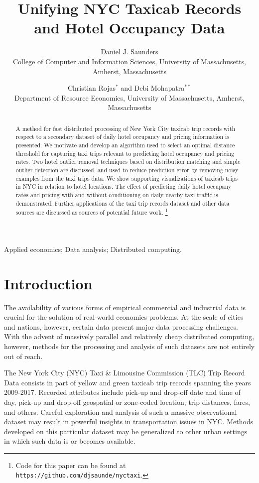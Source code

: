 \documentclass[useAMS, referee, usenatbib]{biom}
\title{Unifying NYC Taxicab Records and Hotel Occupancy Data}
\author
{Daniel J. Saunders \emailx{djsaunde@cs.umass.edu} \\
College of Computer and Information Sciences, University of Massachusetts, Amherst, Massachusetts
\and
Christian Rojas$^{*}$\email{rojas@resecon.umass.edu} and
Debi Mohapatra$^{**}$\email{dmohapatra@umass.edu} \\
Department of Resource Economics, University of Massachusetts, 
Amherst, Massachusetts}
\newcommand\blfootnote[1]{%
  \begingroup
  \renewcommand\thefootnote{}\footnote{#1}%
  \addtocounter{footnote}{-1}%
  \endgroup
}
\begin{document}
\label{firstpage}

\begin{abstract}
A method for fast distributed processing of New York City taxicab trip records with respect to a secondary dataset of daily hotel occupancy and pricing information is presented. We motivate and develop an algorithm used to select an optimal distance threshold for capturing taxi trips relevant to predicting hotel occupancy and pricing rates. Two hotel outlier removal techniques based on distribution matching and simple outlier detection are discussed, and used to reduce prediction error by removing noisy examples from the taxi trips data. We show supporting visualizations of taxicab trips in NYC in relation to hotel locations. The effect of predicting daily hotel occupany rates and pricing with and without conditioning on daily nearby taxi traffic is demonstrated. Further applications of the taxi trip records dataset and other data sources are discussed as sources of potential future work. \blfootnote{Code for this paper can be found at \texttt{https://github.com/djsaunde/nyctaxi}.}
\end{abstract}

\begin{keywords}
Applied economics; Data analysis; Distributed computing.
\end{keywords}

\maketitle

\section{Introduction}
\label{s:intro}

The availability of various forms of empirical commercial and industrial data is crucial for the solution of real-world economics problems. At the scale of cities and nations, however, certain data present major data processing challenges. With the advent of massively parallel and relatively cheap distributed computing, however, methods for the processing and analysis of such datasets are not entirely out of reach.

The New York City (NYC) Taxi \& Limousine Commission (TLC) Trip Record Data consists in part of yellow and green taxicab trip records spanning the years 2009-2017. Recorded attributes include pick-up and drop-off date and time of day, pick-up and drop-off geospatial or zone-coded location, trip distances, fares, and others. Careful exploration and analysis of such a massive observational dataset may result in powerful insights in transportation issues in NYC. Methods developed on this particular dataset may be generalized to other urban settings in which such data is or becomes available.
\end{document}

